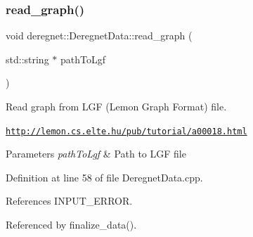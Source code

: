 \subsubsection{\texorpdfstring{read\+\_\+graph()}{read\_graph()}}
{\footnotesize\ttfamily void deregnet\+::\+Deregnet\+Data\+::read\+\_\+graph (\begin{DoxyParamCaption}\item[{std\+::string $\ast$}]{path\+To\+Lgf }\end{DoxyParamCaption})}



Read graph from L\+GF (Lemon Graph Format) file. 

\href{http://lemon.cs.elte.hu/pub/tutorial/a00018.html}{\tt http\+://lemon.\+cs.\+elte.\+hu/pub/tutorial/a00018.\+html}


\begin{DoxyParams}{Parameters}
{\em path\+To\+Lgf} & Path to L\+GF file \\
\hline
\end{DoxyParams}


Definition at line 58 of file Deregnet\+Data.\+cpp.



References I\+N\+P\+U\+T\+\_\+\+E\+R\+R\+OR.



Referenced by finalize\+\_\+data().


